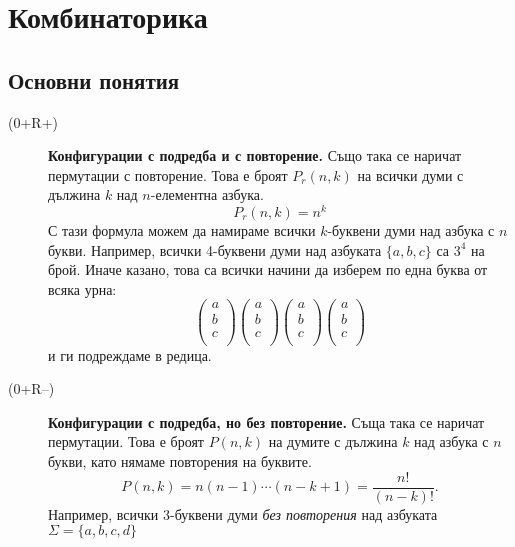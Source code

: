 \chapter{Комбинаторика}

\section{Основни понятия}

\begin{description}
\item[(0+R+)]
  {\bf Конфигурации с подредба и с повторение.}
  Също така се наричат пермутации с повторение.
  Това е броят $P_r(n,k)$ на всички думи с дължина $k$ над $n$-елементна азбука.
  \[P_r(n,k) = n^k\]
  С тази формула можем да намираме всички $k$-буквени думи над азбука с $n$ букви.
  Например, всички 4-буквени думи над азбуката $\{a,b,c\}$ са $3^4$ на брой.
  Иначе казано, това са всички начини да изберем по една буква от всяка урна:
  \[
  \left(\begin{array}{c}
      a\\
      b\\
      c\\
      \end{array}
    \right)
  \left(\begin{array}{c}
      a\\
      b\\
      c\\
      \end{array}
    \right)
  \left(\begin{array}{c}
      a\\
      b\\
      c\\
      \end{array}
    \right)
  \left(\begin{array}{c}
      a\\
      b\\
      c\\
      \end{array}
    \right)
  \]
  и ги подреждаме в редица.
\item[(0+R--)]
  {\bf Конфигурации с подредба, но без повторение.}
  Съща така се наричат пермутации.
  Това е броят $P(n,k)$ на думите с дължина $k$ над азбука с $n$ букви, като нямаме повторения на буквите.
  \[P(n,k) = n(n-1)\cdots(n-k+1) = \frac{n!}{(n-k)!}.\]
  Например, всички 3-буквени думи {\em без повторения} над азбуката $\Sigma = \{a,b,c,d\}$

\end{description}
